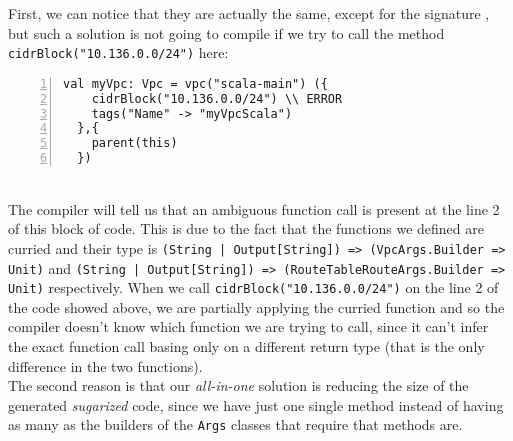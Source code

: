 First, we can notice that they are actually the same, except for the signature , but such a solution is not going to compile if we try to call the method \texttt{cidrBlock("10.136.0.0/24")} here:
\begin{lstlisting}[numbers=left, numberstyle=\tiny, numbersep=-5pt, stepnumber=1, linewidth=420pt]
  val myVpc: Vpc = vpc("scala-main") ({
    cidrBlock("10.136.0.0/24") \\ ERROR
    tags("Name" -> "myVpcScala")
  },{
    parent(this)
  })
\end{lstlisting}\mbox{}\\
The compiler will tell us that an ambiguous function call is present at the line 2 of this block of code.
This is due to the fact that the functions we defined are curried and their type is \texttt{(String | Output[String]) => (VpcArgs.Builder => Unit)} and \texttt{(String | Output[String]) => (RouteTableRouteArgs.Builder => Unit)} respectively.
When we call \texttt{cidrBlock("10.136.0.0/24")} on the line 2 of the code showed above, we are partially applying the curried function and so the compiler doesn't know which function we are trying to call, since it can't infer the exact function call basing only on a different return type (that is the only difference in the two functions).\\
The second reason is that our \textit{all-in-one} solution is reducing the size of the generated \textit{sugarized} code, since we have just one single method instead of having as many as the builders of the \texttt{Args} classes that require that methods are.\\

